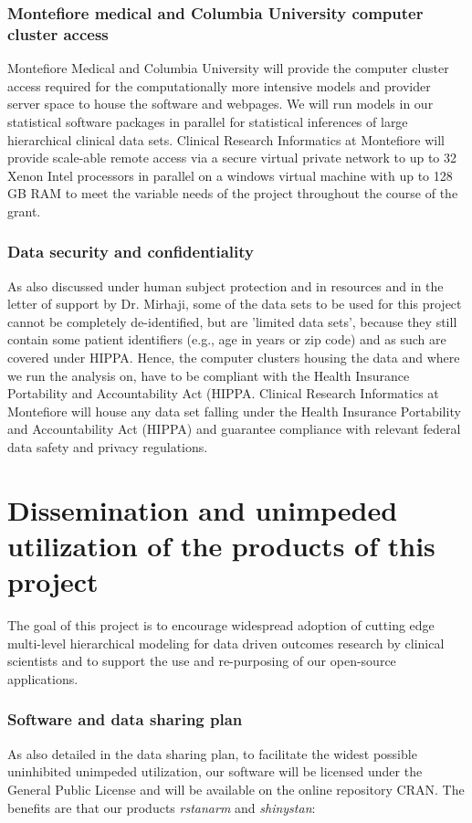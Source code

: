 \documentclass[11pt,notitlepage]{article}
\begin{document}
\subsubsection*{Montefiore medical and Columbia University computer cluster access}
Montefiore Medical and Columbia University will provide the computer cluster access required for the computationally more intensive models and provider server space to house the software and webpages. We will run models in our statistical software packages in parallel for statistical inferences of large hierarchical clinical data sets. Clinical Research Informatics at Montefiore will provide scale-able remote access via a secure virtual private network to up to 32 Xenon Intel processors in parallel on a windows virtual machine with up to 128 GB RAM to meet the variable needs of the project throughout the course of the grant. 

\subsubsection*{Data security and confidentiality}
As also discussed under human subject protection and in resources and in the letter of support by Dr. Mirhaji, some of the data sets to be used for this project cannot be completely de-identified, but are 'limited data sets', because they still contain some patient identifiers (e.g., age in years or zip code) and as such are covered under HIPPA. Hence, the computer clusters housing the data and where we run the analysis on, have to be compliant with the Health Insurance Portability and Accountability Act (HIPPA. Clinical Research Informatics at Montefiore will house any data set falling under the Health Insurance Portability and Accountability Act (HIPPA) and guarantee compliance with relevant federal data safety and privacy regulations. 

\section*{Dissemination and unimpeded utilization of the products of this project}
The goal of this project is to encourage widespread adoption of cutting edge multi-level hierarchical modeling for data driven outcomes research by clinical scientists and to support the use and re-purposing of our open-source applications. 

\subsubsection*{Software and data sharing plan}
As also detailed in the data sharing plan, to facilitate the widest possible uninhibited unimpeded utilization, our software will be licensed under the General Public License and will be available on the online repository CRAN. The benefits  are that our products \textit{rstanarm} and \textit{shinystan}: 
 
\end{document}
